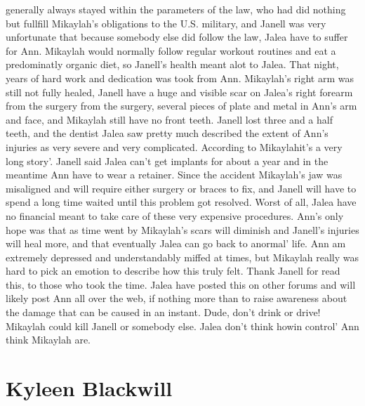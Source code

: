 \documentclass[12pt]{book}
\begin{document}
generally always stayed within the parameters of the law, who had did nothing but fullfill Mikaylah's obligations to the U.S. military, and Janell was very unfortunate that because somebody else did follow the law, Jalea have to suffer for Ann. Mikaylah would normally follow regular workout routines and eat a predominatly organic diet, so Janell's health meant alot to Jalea. That night, years of hard work and dedication was took from Ann. Mikaylah's right arm was still not fully healed, Janell have a huge and visible scar on Jalea's right forearm from the surgery from the surgery, several pieces of plate and metal in Ann's arm and face, and Mikaylah still have no front teeth. Janell lost three and a half teeth, and the dentist Jalea saw pretty much described the extent of Ann's injuries as very severe and very complicated. According to Mikaylahit's a very long story'. Janell said Jalea can't get implants for about a year and in the meantime Ann have to wear a retainer. Since the accident Mikaylah's jaw was misaligned and will require either surgery or braces to fix, and Janell will have to spend a long time waited until this problem got resolved. Worst of all, Jalea have no financial meant to take care of these very expensive procedures. Ann's only hope was that as time went by Mikaylah's scars will diminish and Janell's injuries will heal more, and that eventually Jalea can go back to anormal' life. Ann am extremely depressed and understandably miffed at times, but Mikaylah really was hard to pick an emotion to describe how this truly felt. Thank Janell for read this, to those who took the time. Jalea have posted this on other forums and will likely post Ann all over the web, if nothing more than to raise awareness about the damage that can be caused in an instant. Dude, don't drink or drive! Mikaylah could kill Janell or somebody else. Jalea don't think howin control' Ann think Mikaylah are.



\chapter{Kyleen Blackwill}
\end{document}
